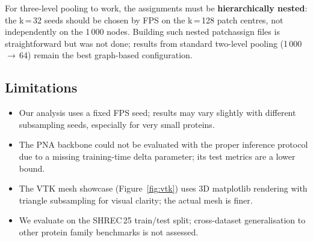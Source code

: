 For three-level pooling to work, the assignments must be \textbf{hierarchically
nested}: the k\,=\,32 seeds should be chosen by FPS on the k\,=\,128 patch
centres, not independently on the 1\,000 nodes.
Building such nested patchassign files is straightforward but was not done;
results from standard two-level pooling (1\,000\,$\to$\,64) remain the best
graph-based configuration.

\subsection{Limitations}

\begin{itemize}
  \item Our analysis uses a fixed FPS seed; results may vary slightly with
        different subsampling seeds, especially for very small proteins.
  \item The PNA backbone could not be evaluated with the proper inference
        protocol due to a missing training-time delta parameter; its test
        metrics are a lower bound.
  \item The VTK mesh showcase (Figure~\ref{fig:vtk}) uses 3D matplotlib
        rendering with triangle subsampling for visual clarity; the actual
        mesh is finer.
  \item We evaluate on the SHREC\,25 train/test split; cross-dataset
        generalisation to other protein family benchmarks is not assessed.
\end{itemize}

